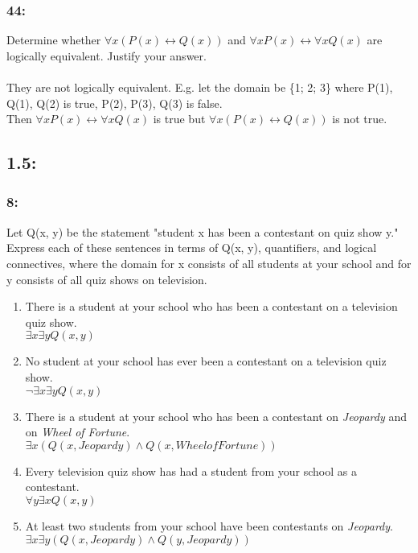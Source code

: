 \documentclass[12pt,en,a4paper]{report}
\begin{document}
	\subsubsection*{44:}
	Determine whether $\forall x (P(x) \leftrightarrow Q(x))$ and $\forall x P(x) \leftrightarrow \forall x Q(x)$ are logically equivalent. Justify your answer.\\\\
	They are not logically equivalent. E.g. let the domain be \{1; 2; 3\} where P(1), Q(1), Q(2) is true, P(2), P(3), Q(3) is false.\\
	Then $\forall x P(x) \leftrightarrow \forall x Q(x)$ is true but $\forall x (P(x) \leftrightarrow Q(x))$ is not true.
\newpage
{}
	\subsection*{1.5:}
	\subsubsection*{8:}
	Let Q(x, y) be the statement "student x has been a contestant on quiz show y." Express each of these sentences in terms of Q(x, y), quantifiers, and logical connectives, where the domain for x consists of all students at your school and for y consists of all quiz shows on television.
	\begin{enumerate}[label=\textbf{\alph*)}]
		\item There is a student at your school who has been a contestant on a television quiz show.\\
		$\exists x \exists y Q(x, y)$
		\item No student at your school has ever been a contestant on a television quiz show.\\
		$\neg \exists x \exists y Q(x, y)$
		\item There is a student at your school who has been a contestant on \textit{Jeopardy} and on  \textit{Wheel of Fortune}.\\
		$\exists x (Q(x, Jeopardy) \wedge Q(x, Wheel of Fortune))$
		\item Every television quiz show has had a student from your school as a contestant.\\
		$\forall y \exists x Q(x, y)$
		\item At least two students from your school have been contestants on \textit{Jeopardy}.\\
		$\exists x \exists y (Q(x, Jeopardy) \wedge Q(y, Jeopardy))$
	\end{enumerate}
\end{document}
